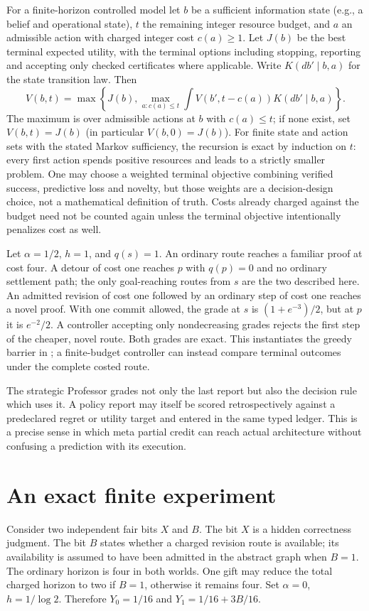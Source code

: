 \documentclass[11pt]{article}
\begin{document}
For a finite-horizon controlled model let $b$ be a sufficient information state (e.g., a belief and operational state), $t$ the remaining integer resource budget, and $a$ an admissible action with charged integer cost $c(a)\geq1$. Let $J(b)$ be the best terminal expected utility, with the terminal options including stopping, reporting and accepting only checked certificates where applicable. Write $K(db'\mid b,a)$ for the state transition law. Then
\begin{equation}V(b,t)=\max\left\{J(b),\max_{a:c(a)\leq t}\int V(b',t-c(a))K(db'\mid b,a)\right\}.\label{eq:bellman}\end{equation}
The maximum is over admissible actions at $b$ with $c(a)\leq t$; if none exist, set $V(b,t)=J(b)$ (in particular $V(b,0)=J(b)$). For finite state and action sets with the stated Markov sufficiency, the recursion is exact by induction on $t$: every first action spends positive resources and leads to a strictly smaller problem. One may choose a weighted terminal objective combining verified success, predictive loss and novelty, but those weights are a decision-design choice, not a mathematical definition of truth. Costs already charged against the budget need not be counted again unless the terminal objective intentionally penalizes cost as well.

\begin{example}
Let $\alpha=1/2$, $h=1$, and $q(s)=1$. An ordinary route reaches a familiar proof at cost four. A detour of cost one reaches $p$ with $q(p)=0$ and no ordinary settlement path; the only goal-reaching routes from $s$ are the two described here. An admitted revision of cost one followed by an ordinary step of cost one reaches a novel proof. With one commit allowed, the grade at $s$ is $(1+e^{-3})/2$, but at $p$ it is $e^{-2}/2$. A controller accepting only nondecreasing grades rejects the first step of the cheaper, novel route. Both grades are exact. This instantiates the greedy barrier in \cite{creative}; a finite-budget controller can instead compare terminal outcomes under the complete costed route.\end{example}
The strategic Professor grades not only the last report but also the decision rule which uses it. A policy report may itself be scored retrospectively against a predeclared regret or utility target and entered in the same typed ledger. This is a precise sense in which meta partial credit can reach actual architecture without confusing a prediction with its execution.
\section{An exact finite experiment}
Consider two independent fair bits $X$ and $B$. The bit $X$ is a hidden correctness judgment. The bit $B$ states whether a charged revision route is available; its availability is assumed to have been admitted in the abstract graph when $B=1$. The ordinary horizon is four in both worlds. One gift may reduce the total charged horizon to two if $B=1$, otherwise it remains four. Set $\alpha=0$, $h=1/\log 2$. Therefore $Y_0=1/16$ and $Y_1=1/16+3B/16$.
\end{document}
